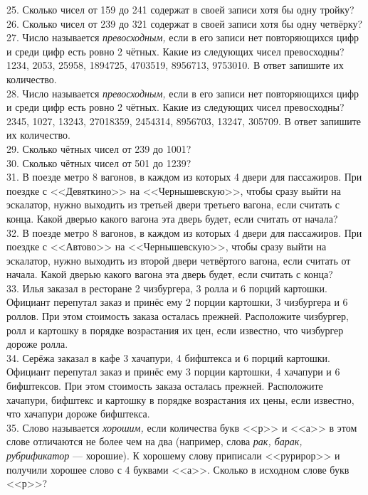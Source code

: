 25. Сколько чисел от 159 до 241 содержат в своей записи хотя бы одну тройку?\\
26. Сколько чисел от 239 до 321 содержат в своей записи хотя бы одну четвёрку?\\
27. Число называется {\it превосходным,} если в его записи нет повторяющихся цифр и среди цифр есть ровно 2 чётных. Какие из следующих чисел превосходны? 1234, 2053, 25958, 1894725, 4703519, 8956713, 9753010. В ответ запишите их количество.\\
28. Число называется {\it превосходным,} если в его записи нет повторяющихся цифр и среди цифр есть ровно 2 чётных. Какие из следующих чисел превосходны? 2345, 1027, 13243, 27018359, 2454314, 8956703, 13247, 305709. В ответ запишите их количество.\\
29. Сколько чётных чисел от 239 до 1001?\\
30. Сколько чётных чисел от 501 до 1239?\\
31. В поезде метро 8 вагонов, в каждом из которых 4 двери для пассажиров. При поездке с <<Девяткино>> на <<Чернышевскую>>, чтобы сразу выйти на эскалатор, нужно выходить из третьей двери третьего вагона, если считать с конца. Какой дверью какого вагона эта дверь будет, если считать от начала?\\
32. В поезде метро 8 вагонов, в каждом из которых 4 двери для пассажиров. При поездке с <<Автово>> на <<Чернышевскую>>, чтобы сразу выйти на эскалатор, нужно выходить из второй двери четвёртого вагона, если считать от начала. Какой дверью какого вагона эта дверь будет, если считать с конца?\\
33. Илья заказал в ресторане 2 чизбургера, 3 ролла и 6 порций картошки. Официант перепутал заказ и принёс ему 2 порции картошки, 3 чизбургера и 6 роллов. При этом стоимость заказа осталась прежней. Расположите чизбургер, ролл и картошку в порядке возрастания их цен, если известно, что чизбургер дороже ролла.\\
34. Серёжа заказал в кафе 3 хачапури, 4 бифштекса и 6 порций картошки. Официант перепутал заказ и принёс ему 3 порции картошки, 4 хачапури и 6 бифштексов. При этом стоимость заказа осталась прежней. Расположите хачапури, бифштекс и картошку в порядке возрастания их цены, если известно, что хачапури дороже бифштекса.\\
35. Слово называется {\it хорошим,} если количества букв <<р>> и <<а>> в этом слове отличаются не более чем на два (например, слова {\it рак, барак, рубрификатор} --- хорошие). К хорошему слову приписали <<рурирор>> и получили хорошее слово с 4 буквами <<а>>. Сколько в исходном слове букв <<р>>?\\
